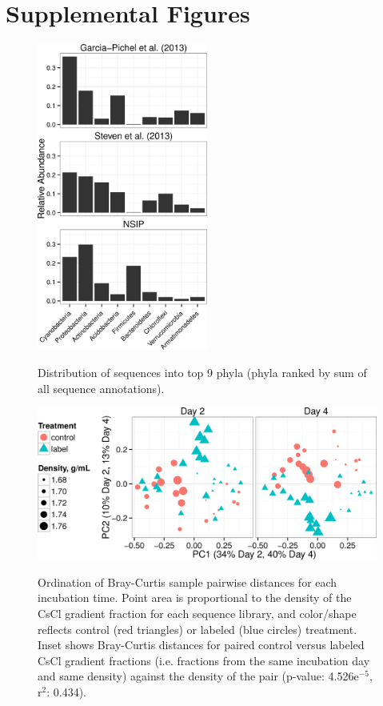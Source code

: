 \section{Supplemental Figures}
\newpage

\begin{figure}[h!]
  \centering
  \caption{Distribution of sequences into top 9 phyla (phyla ranked by sum of all sequence annotations).}
    \includegraphics[width=0.5\textwidth]{figures/study_phylum_dist/study_phylum_dist.png}
  \label{fig:study_phy_dist}
\end{figure}

\begin{figure}[H]
  \centering
  \caption{Ordination of Bray-Curtis sample pairwise distances for each incubation time. Point area is proportional to the density of the CsCl gradient fraction for each sequence library, and color/shape reflects control (red triangles) or labeled (blue circles) treatment. Inset shows Bray-Curtis distances for paired control versus labeled CsCl gradient fractions (i.e. fractions from the same incubation day and same density) against the density of the pair (p-value: 4.526e$^{-5}$, r$^{2}$: 0.434).}
  \includegraphics[width=1.0\textwidth]{figures/ordination_all_day_facet/ordination_all_day_facet.png}
  \label{fig:ordination}
\end{figure}


